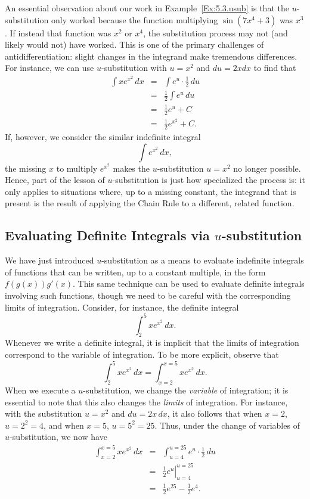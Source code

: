 An essential observation about our work in Example~\ref{Ex:5.3.usub} is that the $u$-substitution only worked because the function multiplying $\sin (7x^4 + 3)$ was $x^3$.  If instead that function was $x^2$ or $x^4$, the substitution process may not (and likely would not) have worked.  This is one of the primary challenges of antidifferentiation: slight changes in the integrand make tremendous differences.  For instance, we can use $u$-substitution with $u = x^2$ and $du = 2xdx$ to find that
\begin{eqnarray*}
\int xe^{x^2} \, dx & = & \int e^u \cdot \frac{1}{2} \, du \\
			& = & \frac{1}{2} \int e^u \, du \\
			& = & \frac{1}{2} e^u + C \\
			& = & \frac{1}{2} e^{x^2} + C.
\end{eqnarray*}
If, however, we consider the similar indefinite integral
$$\int e^{x^2} \, dx,$$
the missing $x$ to multiply $e^{x^2}$ makes the $u$-substitution $u = x^2$ no longer possible.  Hence, part of the lesson of $u$-substitution is just how specialized the process is: it only applies to situations where, up to a missing constant, the integrand that is present is the result of applying the Chain Rule to a different, related function.




\subsection*{Evaluating Definite Integrals via $u$-substitution}

We have just introduced $u$-substitution as a means to evaluate indefinite integrals of functions that can be written, up to a constant multiple, in the form $f(g(x))g'(x)$.  This same technique can be used to evaluate definite integrals involving such functions, though we need to be careful with the corresponding limits of integration.  Consider, for instance, the definite integral
$$\int_2^5 xe^{x^2} \, dx.$$
Whenever we write a definite integral, it is implicit that the limits of integration correspond to the variable of integration.  To be more explicit, observe that
$$\int_2^5 xe^{x^2} \, dx = \int_{x=2}^{x=5} xe^{x^2} \, dx.$$
When we execute a $u$-substitution, we change the \emph{variable} of integration; it is essential to note that this also changes the \emph{limits} of integration.  For instance, with the substitution $u = x^2$ and $du = 2x \, dx$, it also follows that when $x = 2$, $u = 2^2 = 4$, and when $x = 5$, $u = 5^2 = 25.$  Thus, under the change of variables of $u$-substitution, we now have
\begin{eqnarray*}
\int_{x=2}^{x=5} xe^{x^2} \, dx & = & \int_{u=4}^{u=25} e^{u} \cdot \frac{1}{2} \, du \\
				& = & \left. \frac{1}{2}e^u \right|_{u=4}^{u=25} \\
				& = & \frac{1}{2}e^{25} - \frac{1}{2}e^4.
\end{eqnarray*}

